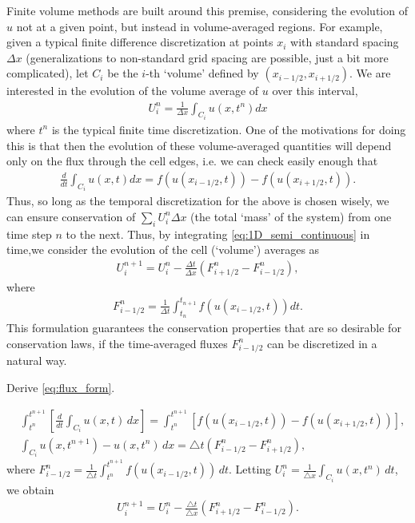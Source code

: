 Finite volume methods are built around this premise, considering the evolution of $u$ not at a given point, but instead in volume-averaged regions.  For example, given a typical finite difference discretization at points $x_i$ with standard spacing $\Delta x$ (generalizations to non-standard grid spacing are possible, just a bit more complicated), let $C_i$ be the $i$-th `volume' defined by $(x_{i-1/2},x_{i+1/2})$. We are interested in the evolution of the volume average of $u$ over this interval,
\begin{align*}
U_i^n  = \frac{1}{\Delta x}\int_{C_i} u(x,t^n)dx
\end{align*}
where $t^n$ is the typical finite time discretization.  One of the motivations for doing this is that then the evolution of these volume-averaged quantities will depend only on the flux through the cell edges, i.e. we can check easily enough that
\begin{gather}\label{eq:1D_semi_continuous}
\frac{d}{dt}\int_{C_i} u(x,t) dx = f(u(x_{i-1/2},t))-f(u(x_{i+1/2},t)).
\end{gather}
Thus, so long as the temporal discretization for the above is chosen wisely, we can ensure conservation of $\sum_i U_i^n\Delta x$ (the total `mass' of the system) from one time step $n$ to the next.  Thus, by integrating \eqref{eq:1D_semi_continuous} in time,we consider the evolution of the cell (`volume') averages as
\begin{gather}\label{eq:flux_form}
U_i^{n+1} = U_i^n - \frac{\Delta t}{\Delta x} \left(F^n_{i+1/2}-F^n_{i-1/2}\right),
\end{gather}
where
\begin{gather}
F_{i-1/2}^n = \frac{1}{\Delta t} \int_{t_n}^{t_{n+1}}f(u(x_{i-1/2},t))dt. 
\end{gather}
This formulation guarantees the conservation properties that are so desirable for conservation laws, if the time-averaged fluxes $F_{i-1/2}^n$ can be discretized in a natural way.

\begin{problem}
Derive \eqref{eq:flux_form}.

\begin{align*}
&{ }\int_{t^n}^{t^{n+1}} \left[ \frac{d}{dt}\int_{C_i} u(x,t)\, dx \right] = \int_{t^n}^{t^{n+1}} \left[ f(u(x_{i-1/2},t)) - f(u(x_{i+1/2},t)) \right], \\
&{ }\int_{C_i} u(x,t^{n+1}) - u(x,t^{n})\, dx = \triangle t \left(F^n_{i-1/2} - F^n_{i+1/2}\right),
\end{align*}
where $F^n_{i-1/2} = \frac{1}{\triangle t}\int_{t^n}^{t^{n+1}} f(u(x_{i-1/2},t)) \, dt.$
Letting $U_i^n = \frac{1}{\triangle x} \int_{C_i} u(x,t^n) \, dt$, we obtain 
\begin{align*}
	U_i^{n+1} = U_i^n - \frac{\triangle t}{\triangle x} \left( F^n_{i+1/2} - F^n_{i-1/2}\right).
\end{align*}
\end{problem}

